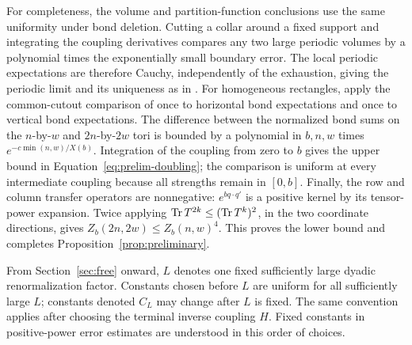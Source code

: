 For completeness, the volume and partition-function conclusions use
the same uniformity under bond deletion. Cutting a collar around a
fixed support and integrating the coupling derivatives compares any
two large periodic volumes by a polynomial times the exponentially
small boundary error. The local periodic expectations are therefore
Cauchy, independently of the exhaustion, giving the periodic limit and
its uniqueness as in .
For homogeneous rectangles, apply the common-cutout comparison of
 once to horizontal bond expectations and once to
vertical bond expectations. The difference between the normalized
bond sums on the $n$-by-$w$ and $2n$-by-$2w$ tori is bounded by a
polynomial in $b,n,w$ times $e^{-c\min(n,w)/X(b)}$.
Integration of the coupling from zero to $b$ gives the upper bound in
Equation~\eqref{eq:prelim-doubling}; the comparison is uniform at every
intermediate coupling because all strengths remain in $[0,b]$.
Finally, the row and column transfer operators are nonnegative:
$e^{bq\cdot q'}$ is a positive kernel by its tensor-power expansion.
Twice applying $\operatorname{Tr} T^{2k}\le(\operatorname{Tr} T^k)^2$, in the two coordinate
directions, gives $Z_b(2n,2w)\le Z_b(n,w)^4$. This proves the lower
bound and completes Proposition~\ref{prop:preliminary}.

From Section~\ref{sec:free} onward, $L$ denotes one fixed sufficiently
large dyadic renormalization factor. Constants chosen before $L$ are
uniform for all sufficiently large $L$; constants denoted $C_L$ may
change after $L$ is fixed. The same convention applies after choosing
the terminal inverse coupling $H$. Fixed constants in positive-power
error estimates are understood in this order of choices.
